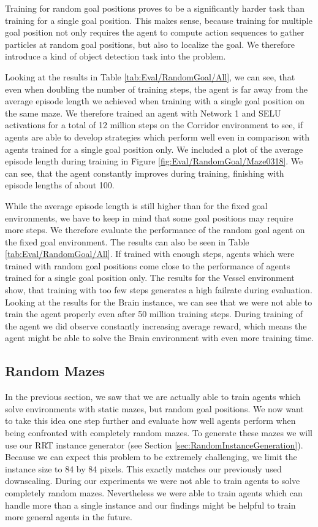 Training for random goal positions proves to be a significantly harder task than training for a single goal position. This makes sense, because training for multiple goal position not only requires the agent to compute action sequences to gather particles at random goal positions, but also to localize the goal. We therefore introduce a kind of object detection task into the problem. 

Looking at the results in Table \ref{tab:Eval/RandomGoal/All}, we can see, that even when doubling the number of training steps, the agent is far away from the average episode length we achieved when training with a single goal position on the same maze. We therefore trained an agent with Network 1 and SELU activations for a total of 12 million steps on the Corridor environment to see, if agents are able to develop strategies which perform well even in comparison with agents trained for a single goal position only. We included a plot of the average episode length during training in Figure \ref{fig:Eval/RandomGoal/Maze0318}. We can see, that the agent constantly improves during training, finishing with episode lengths of about 100. 

While the average episode length is still higher than for the fixed goal environments, we have to keep in mind that some goal positions may require more steps. We therefore evaluate the performance of the random goal agent on the fixed goal environment. The results can also be seen in Table \ref{tab:Eval/RandomGoal/All}. If trained with enough steps, agents which were trained with random goal positions come close to the performance of agents trained for a single goal position only. The results for the Vessel environment show, that training with too few steps generates a high failrate during evaluation. Looking at the results for the Brain instance, we can see that we were not able to train the agent properly even after 50 million training steps. During training of the agent we did observe constantly increasing average reward, which means the agent might be able to solve the Brain environment with even more training time.  

\subsection{Random Mazes} \label{sec:EvalRandomMaze}
In the previous section, we saw that we are actually able to train agents which solve environments with static mazes, but random goal positions. We now want to take this idea one step further and evaluate how well agents perform when being confronted with completely random mazes. To generate these mazes we will use our RRT instance generator (see Section \ref{sec:RandomInstanceGeneration}). Because we can expect this problem to be extremely challenging, we limit the instance size to 84 by 84 pixels. This exactly matches our previously used downscaling. During our experiments we were not able to train agents to solve completely random mazes. Nevertheless we were able to train agents which can handle more than a single instance and our findings might be helpful to train more general agents in the future.

